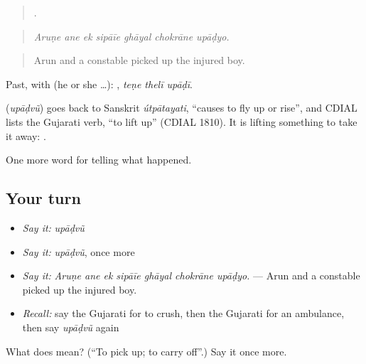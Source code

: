 \begin{quote}
      .
\end{quote}

\begin{quote}
\emph{Aruṇe ane ek sipāīe ghāyal chokrāne upāḍyo.}
\end{quote}

\begin{quote}
Arun and a constable picked up the injured boy.
\end{quote}

Past, with  (he or she …):   , \emph{teṇe thelī upāḍī}.

\begin{cousinweb}
\textbf{} (\emph{upāḍvũ}) goes back to Sanskrit \emph{útpātayati}, \textquotedblleft{}causes to fly up or rise\textquotedblright{}, and CDIAL lists the Gujarati verb, \textquotedblleft{}to lift up\textquotedblright{} (CDIAL 1810). It is lifting something to take it away: \textbf{  }.
\end{cousinweb}

\begin{grammarlens}[title={What you've built}]
One more word for telling what happened.
\end{grammarlens}

\subsection*{Your turn}
\begin{itemize}
\raggedright
  \item \emph{Say it:} \emph{upāḍvũ}
  \item \emph{Say it:} \emph{upāḍvũ}, once more
  \item \emph{Say it:} \emph{Aruṇe ane ek sipāīe ghāyal chokrāne upāḍyo.} — Arun and a constable picked up the injured boy.
  \item \emph{Recall:} say the Gujarati for to crush, then the Gujarati for an ambulance, then say \emph{upāḍvũ} again
\end{itemize}

\begin{tcolorbox}[breakable,colback=teal!4,colframe=teal!35!black,title={Before you move on}]
What does  mean? (\textquotedblleft{}To pick up; to carry off\textquotedblright{}.) Say it once more.
\end{tcolorbox}
